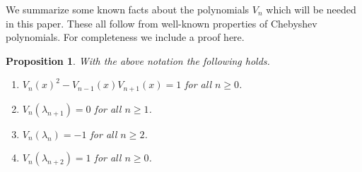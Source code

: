 \documentclass[11pt,a4paper]{amsart}
\newtheorem{Proposition}[Lemma]{Proposition}
\theoremstyle{definition}
\numberwithin{equation}{section}
\begin{document}
We summarize some known facts about the polynomials $V_n$ which will be needed in this paper. These all follow from 
well-known properties of Chebyshev polynomials. For completeness we include a proof here. 


\begin{Proposition} \label{prop:chebyshev}
With the above notation the following holds.
\begin{enumerate}
\item[{(i)}] $V_n(x)^2 - V_{n-1}(x)V_{n+1}(x) = 1$ for all $n\ge 0$. 
\item[{(ii)}] $V_n(\lambda_{n+1})=0$ for all $n\ge 1$.
\item[{(iii)}] $V_n(\lambda_n)=-1$ for all $n\ge 2$.
\item[{(iv)}] $V_{n}(\lambda_{n+2})=1$ for all $n\ge 0$. 
\end{enumerate}
\end{Proposition}
\end{document}
